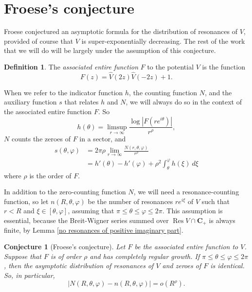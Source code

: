 \documentclass[12pt]{report}
\newcommand{\CC}{\mathbf{C}}
\DeclareMathOperator{\Res}{Res}
\newcommand{\dfn}[1]{\emph{#1}\index{#1}}
\newtheorem{conjecture}[theorem]{Conjecture}
\theoremstyle{definition}
\newtheorem{definition}[theorem]{Definition}
\begin{document}
\section{Froese's conjecture}
Froese \cite{froese1997asymptotic} conjectured an asymptotic formula for the distribution of resonances of $V$, provided of course that $V$ is super-exponentially decreasing. The rest of the work that we will do will be largely under the assumption of this conjecture.
\begin{definition}
The \dfn{associated entire function} $F$ to the potential $V$ is the function
$$F(z) = \hat V(2z)\hat V(-2z) + 1.$$
\end{definition}
When we refer to the indicator function $h$, the counting function $N$, and the auxiliary function $s$ that relates $h$ and $N$, we will always do so in the context of the associated entire function $F$. So
$$h(\theta) = \limsup_{r \to \infty} \frac{\log|F(re^{i\theta})|}{r^\rho},$$
$N$ counts the zeroes of $F$ in a sector, and
\begin{align*}
s(\theta, \varphi) &= 2\pi\rho \lim_{r \to \infty} \frac{N(r, \theta, \varphi)}{r^\rho}\\
&= h'(\theta) - h'(\varphi) + \rho^2\int_\theta^\varphi h(\xi) ~d\xi
\end{align*}
where $\rho$ is the order of $F$.

In addition to the zero-counting function $N$, we will need a resonance-counting function, so let $n(R, \theta, \varphi)$ be the number of resonances $re^{i\xi}$ of $V$ such that $r < R$ and $\xi \in [\theta, \varphi]$, assuming that $\pi \leq \theta \leq \varphi \leq 2\pi$.
This assumption is essential, because the Breit-Wigner series summed over $\Res V \cap \CC_+$ is always finite, by Lemma \ref{no resonances of positive imaginary part}.
\begin{conjecture}[Froese's conjecture]
Let $F$ be the associated entire function to $V$. Suppose that $F$ is of order $\rho$ and has completely regular growth. If $\pi \leq \theta \leq \varphi \leq 2\pi$, then the asymptotic distribution of resonances of $V$ and zeroes of $F$ is identical. So, in particular,
$$|N(R, \theta, \varphi) - n(R, \theta, \varphi)| = o(R^\rho).$$
\end{conjecture}
\end{document}
